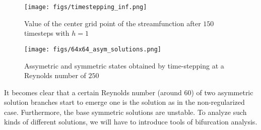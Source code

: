 \begin{figure}[ht!]
\begin{center}
  \texttt{[image: figs/timestepping\_inf.png]}
\end{center}
\caption{Value of the center grid point of the streamfunction after $150$
  timesteps with $h=1$}
\label{fig:timestepping}
\end{figure}

\begin{figure}[ht!]
\begin{center}
  \texttt{[image: figs/64x64\_asym\_solutions.png]}
\end{center}
\caption{Assymetric and symmetric states obtained by time-stepping at a
  Reynolds number of $250$}
\label{fig:r4sc_states}
\end{figure}

It becomes clear that a certain Reynolds number (around $60$) of two asymmetric
solution branches start to emerge one is the solution as in the non-regularized
case. Furthermore, the base symmetric solutions are unstable. To analyze such
kinds of different solutions, we will have to introduce tools of bifurcation
analysis.
